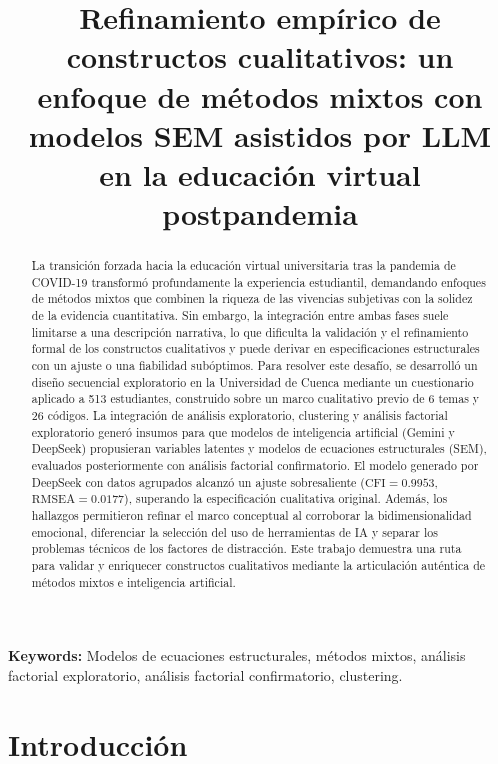 \documentclass[conference]{IEEEtran}
\title{Refinamiento empírico de constructos cualitativos: un enfoque de métodos mixtos con modelos SEM asistidos por LLM en la educación virtual postpandemia}
\author{}
\date{}
\begin{document}
\raggedbottom %

\maketitle

\begin{abstract}
La transición forzada hacia la educación virtual universitaria tras la pandemia de COVID-19 transformó profundamente la experiencia estudiantil, demandando enfoques de métodos mixtos que combinen la riqueza de las vivencias subjetivas con la solidez de la evidencia cuantitativa. Sin embargo, la integración entre ambas fases suele limitarse a una descripción narrativa, lo que dificulta la validación y el refinamiento formal de los constructos cualitativos y puede derivar en especificaciones estructurales con un ajuste o una fiabilidad subóptimos. Para resolver este desafío, se desarrolló un diseño secuencial exploratorio en la Universidad de Cuenca mediante un cuestionario aplicado a 513 estudiantes, construido sobre un marco cualitativo previo de 6 temas y 26 códigos. La integración de análisis exploratorio, clustering y análisis factorial exploratorio generó insumos para que modelos de inteligencia artificial (Gemini y DeepSeek) propusieran variables latentes y modelos de ecuaciones estructurales (SEM), evaluados posteriormente con análisis factorial confirmatorio. El modelo generado por DeepSeek con datos agrupados alcanzó un ajuste sobresaliente ($\text{CFI} = 0.9953$, $\text{RMSEA} = 0.0177$), superando la especificación cualitativa original. Además, los hallazgos permitieron refinar el marco conceptual al corroborar la bidimensionalidad emocional, diferenciar la selección del uso de herramientas de IA y separar los problemas técnicos de los factores de distracción. Este trabajo demuestra una ruta para validar y enriquecer constructos cualitativos mediante la articulación auténtica de métodos mixtos e inteligencia artificial. 
\end{abstract}

\noindent\textbf{Keywords:} Modelos de ecuaciones estructurales, métodos mixtos, análisis factorial exploratorio, análisis factorial confirmatorio, clustering.

\section{Introducción}
\label{sec:introduccion}
\end{document}
